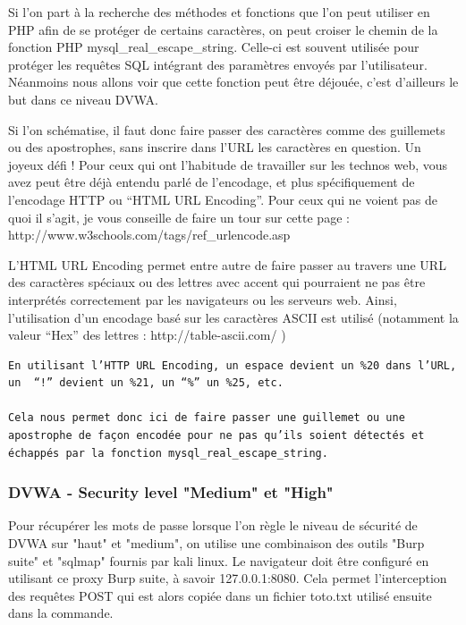 Si l’on part à la recherche des méthodes et fonctions que l’on peut utiliser en PHP afin de se protéger de certains caractères, on peut croiser le chemin de la fonction PHP mysql\_real\_escape\_string. Celle-ci est souvent utilisée pour protéger les requêtes SQL intégrant des paramètres envoyés par l’utilisateur. Néanmoins nous allons voir que cette fonction peut être déjouée, c’est d’ailleurs le but dans ce niveau DVWA.

Si l’on schématise, il faut donc faire passer des caractères comme des guillemets ou des apostrophes, sans inscrire dans l’URL les caractères en question. Un joyeux défi ! Pour ceux qui ont l’habitude de travailler sur les technos web, vous avez peut être déjà entendu parlé de l’encodage, et plus spécifiquement de l’encodage HTTP ou “HTML URL Encoding”. Pour ceux qui ne voient pas de quoi il s’agit, je vous conseille de faire un tour sur cette page : http://www.w3schools.com/tags/ref\_urlencode.asp

L’HTML URL Encoding permet entre autre de faire passer au travers une URL des caractères spéciaux ou des lettres avec accent qui pourraient ne pas être interprétés correctement par les navigateurs ou les serveurs web. Ainsi, l’utilisation d’un encodage basé sur les caractères ASCII est utilisé (notamment la valeur “Hex” des lettres : http://table-ascii.com/ )

\begin{verbatim}
En utilisant l’HTTP URL Encoding, un espace devient un %20 dans l’URL, un  “!” devient un %21, un “%” un %25, etc.

Cela nous permet donc ici de faire passer une guillemet ou une apostrophe de façon encodée pour ne pas qu’ils soient détectés et échappés par la fonction mysql_real_escape_string.
\end{verbatim}


\subsubsection{DVWA - Security level "Medium" et "High"}

Pour récupérer les mots de passe lorsque l'on règle le niveau de sécurité de DVWA sur "haut" et "medium", on utilise une combinaison des outils "Burp suite" et "sqlmap" fournis par kali linux. Le navigateur doit être configuré en utilisant ce proxy Burp suite, à savoir 127.0.0.1:8080. Cela permet l'interception des requêtes POST qui est alors copiée dans un fichier toto.txt utilisé ensuite dans la commande.

